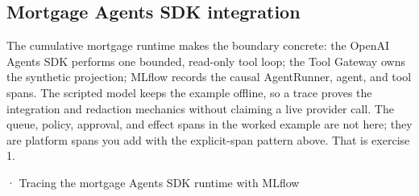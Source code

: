 \subsection{Mortgage Agents SDK integration}

The cumulative mortgage runtime makes the boundary concrete: the OpenAI Agents SDK performs one bounded, read-only tool loop; the Tool Gateway owns the synthetic projection; MLflow records the causal AgentRunner, agent, and tool spans. The scripted model keeps the example offline, so a trace proves the integration and redaction mechanics without claiming a live provider call. The queue, policy, approval, and effect spans in the worked example are not here; they are platform spans you add with the explicit-span pattern above. That is exercise 1.\par

\BookSnake · Tracing the mortgage Agents SDK runtime with MLflow\par

